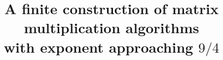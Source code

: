 \documentclass[11pt]{article}
\title{A finite construction of matrix multiplication algorithms\\with exponent approaching \(9/4\)}
\author{}
\date{}
\theoremstyle{definition}
\theoremstyle{remark}
\numberwithin{equation}{section}
\begin{document}
\maketitle
\begin{abstract}

\end{abstract}

\setcounter{tocdepth}{1}
\tableofcontents












\appendix






\end{document}
